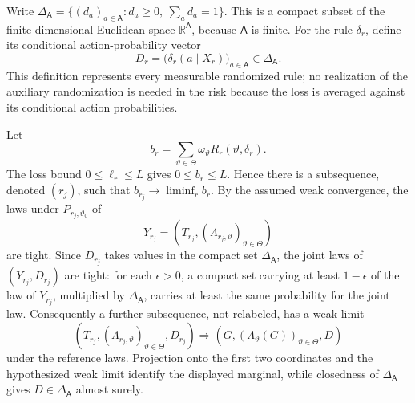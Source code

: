 Write \(\Delta_{\mathsf A}=\{(d_a)_{a\in\mathsf A}:d_a\geq0,\ \sum_a d_a=1\}\). This is a compact subset of the finite-dimensional Euclidean space \(\mathbb R^{\mathsf A}\), because \(\mathsf A\) is finite. For the rule \(\delta_r\), define its conditional action-probability vector
\[
 D_r=\bigl(\delta_r(a\mid X_r)\bigr)_{a\in\mathsf A}\in\Delta_{\mathsf A}.
\]
This definition represents every measurable randomized rule; no realization of the auxiliary randomization is needed in the risk because the loss is averaged against its conditional action probabilities.

Let
\[
 b_r=\sum_{\vartheta\in\Theta}\omega_\vartheta
 R_r(\vartheta,\delta_r).
\]
The loss bound \(0\leq\ell_r\leq L\) gives \(0\leq b_r\leq L\). Hence there is a subsequence, denoted \((r_j)\), such that \(b_{r_j}\to\liminf_r b_r\). By the assumed weak convergence, the laws under \(P_{r_j,\vartheta_0}\) of
\[
 Y_{r_j}=\left(T_{r_j},(\Lambda_{r_j,\vartheta})_{\vartheta\in\Theta}\right)
\]
are tight. Since \(D_{r_j}\) takes values in the compact set \(\Delta_{\mathsf A}\), the joint laws of \((Y_{r_j},D_{r_j})\) are tight: for each \(\epsilon>0\), a compact set carrying at least \(1-\epsilon\) of the law of \(Y_{r_j}\), multiplied by \(\Delta_{\mathsf A}\), carries at least the same probability for the joint law. Consequently a further subsequence, not relabeled, has a weak limit
\[
 \left(T_{r_j},(\Lambda_{r_j,\vartheta})_{\vartheta\in\Theta},D_{r_j}\right)
 \Rightarrow
 \left(G,(\Lambda_\vartheta(G))_{\vartheta\in\Theta},D\right)
\]
under the reference laws. Projection onto the first two coordinates and the hypothesized weak limit identify the displayed marginal, while closedness of \(\Delta_{\mathsf A}\) gives \(D\in\Delta_{\mathsf A}\) almost surely.

